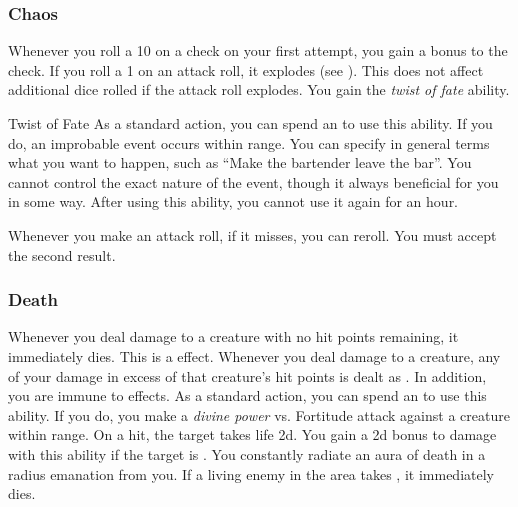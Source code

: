         \subsubsection{Chaos}
             Whenever you roll a 10 on a check on your first attempt, you gain a  bonus to the check.
             If you roll a 1 on an attack roll, it explodes (see ).
            This does not affect additional dice rolled if the attack roll explodes.
             You gain the \textit{twist of fate} ability.
            \begin{ability}{Twist of Fate}
                As a standard action, you can spend an  to use this ability.
                If you do, an improbable event occurs within \rnglong range.
                You can specify in general terms what you want to happen, such as ``Make the bartender leave the bar''.
                You cannot control the exact nature of the event, though it always beneficial for you in some way.
                After using this ability, you cannot use it again for an hour.
            \end{ability}
             Whenever you make an attack roll, if it misses, you can reroll.
            You must accept the second result.

        \subsubsection{Death}
             Whenever you deal damage to a creature with no hit points remaining, it immediately dies.
            This is a  effect.
             Whenever you deal damage to a creature, any of your damage in excess of that creature's hit points is dealt as .
            In addition, you are immune to  effects.
             As a standard action, you can spend an  to use this ability.
            If you do, you make a \textit{divine power} vs. Fortitude attack against a creature within \rngmed range.
            On a hit, the target takes life  \plus2d.
            You gain a \plus2d bonus to damage with this ability if the target is .
             You constantly radiate an aura of death in a \areahuge radius emanation from you.
            If a living enemy in the area takes , it immediately dies.

